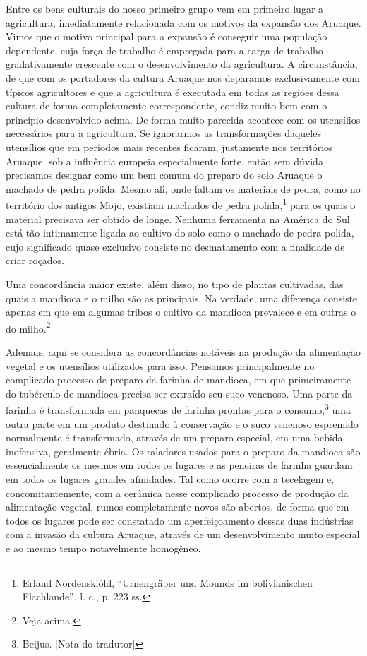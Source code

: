Entre os bens culturais do nosso primeiro grupo vem em primeiro lugar a
agricultura, imediatamente relacionada com os motivos da expansão dos
Aruaque. Vimos que o motivo principal para a expansão é conseguir uma
população dependente, cuja força de trabalho é empregada para a carga de
trabalho gradativamente crescente com o desenvolvimento da agricultura.
A circunstância, de que com os portadores da cultura Aruaque nos
deparamos exclusivamente com típicos agricultores e que a agricultura é
executada em todas as regiões dessa cultura de forma completamente
correspondente, condiz muito bem com o princípio desenvolvido acima. De
forma muito parecida acontece com os utensílios necessários para a
agricultura. Se ignorarmos as transformações daqueles utensílios que em
períodos mais recentes ficaram, justamente nos territórios Aruaque, sob
a influência europeia especialmente forte, então sem dúvida precisamos
designar como um bem comum do preparo do solo Aruaque o machado de pedra
polida. Mesmo ali, onde faltam os materiais de pedra, como no território
dos antigos Mojo, existiam machados de pedra polida,\footnote{Erland
  Nordenskiöld, ``Urnengräber und Mounds im bolivianischen Flachlande'',
  l. c., p. 223 ss.} para os quais o material precisava ser obtido de
longe. Nenhuma ferramenta na América do Sul está tão intimamente ligada
ao cultivo do solo como o machado de pedra polida, cujo significado
quase exclusivo consiste no desmatamento com a finalidade de criar
roçados.

Uma concordância maior existe, além disso, no tipo de plantas
cultivadas, das quais a mandioca e o milho são as principais. Na
verdade, uma diferença consiste apenas em que em algumas tribos o
cultivo da mandioca prevalece e em outras o do milho.\footnote{Veja
  acima.}

Ademais, aqui se considera as concordâncias notáveis na produção da
alimentação vegetal e os utensílios utilizados para isso. Pensamos
principalmente no complicado processo de preparo da farinha de
mandioca, em que primeiramente do tubérculo de mandioca precisa ser
extraído seu suco venenoso. Uma parte da farinha é transformada em
panquecas de farinha prontas para o consumo,\footnote[*]{Beijus. {[}Nota do tradutor{]}} uma
outra parte em um produto destinado à conservação e o suco venenoso
espremido normalmente é transformado, através de um preparo especial, em
uma bebida inofensiva, geralmente ébria. Os raladores usados para o
preparo da mandioca são essencialmente os mesmos em todos os lugares e
as peneiras de farinha guardam em todos os lugares grandes afinidades.
Tal como ocorre com a tecelagem e, concomitantemente, com a cerâmica
nesse complicado processo de produção da alimentação vegetal, rumos
completamente novos são abertos, de forma que em todos os lugares pode
ser constatado um aperfeiçoamento dessas duas indústrias com a invasão
da cultura Aruaque, através de um desenvolvimento muito especial e ao
mesmo tempo notavelmente homogêneo.

